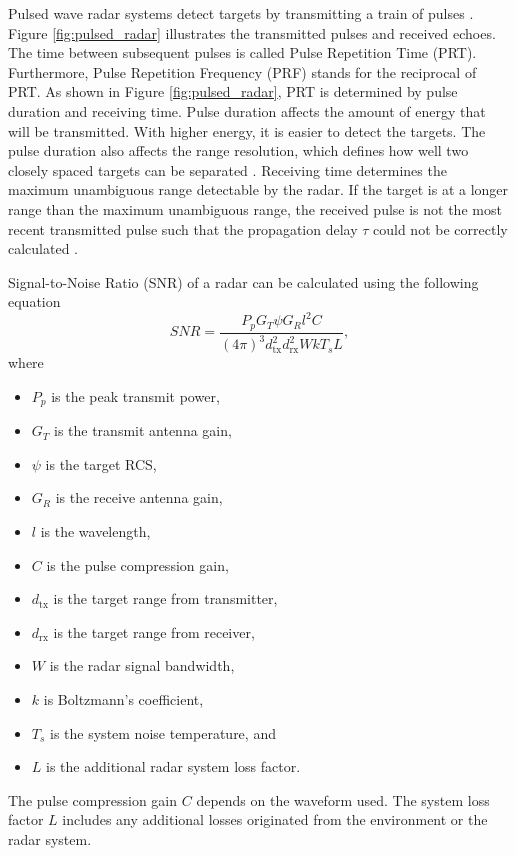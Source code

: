 \documentclass[english, 12pt, a4paper, elec, utf8, a-1b, online]{aaltothesis}
\numberwithin{equation}{section}
\begin{document}
Pulsed wave radar systems detect targets by transmitting a train of pulses \cite{Mahafza2015}.
Figure \ref{fig:pulsed_radar} illustrates the transmitted pulses and received echoes.
The time between subsequent pulses is called Pulse Repetition Time (PRT). 
Furthermore, Pulse Repetition Frequency (PRF) stands for the reciprocal of PRT.
As shown in Figure \ref{fig:pulsed_radar}, PRT is determined by pulse duration and receiving time.
Pulse duration affects the amount of energy that will be transmitted.
With higher energy, it is easier to detect the targets.
The pulse duration also affects the range resolution, which defines how well two closely spaced targets can be separated \cite{Curry2011}.
Receiving time determines the maximum unambiguous range detectable by the radar.
If the target is at a longer range than the maximum unambiguous range, the received pulse is not the most recent transmitted pulse such that the propagation delay $\tau$ could not be correctly calculated \cite{Curry2011}.

Signal-to-Noise Ratio (SNR) of a radar can be calculated using the following equation \cite{Curry2011}
\begin{equation} \label{eq:radar_snr}
SNR = \frac{P_p G_T \psi G_R l^2 C}{(4\pi)^3 d_\text{tx}^2 d_\text{rx}^2 W k T_s L},
\end{equation}
where
\begin{itemize}
    \item $P_p$ is the peak transmit power,
    \item $G_T$ is the transmit antenna gain,
    \item $\psi$ is the target RCS,
    \item $G_R$ is the receive antenna gain,
    \item $l$ is the wavelength,
    \item $C$ is the pulse compression gain,
    \item $d_\text{tx}$ is the target range from transmitter,
    \item $d_\text{rx}$ is the target range from receiver,
    \item $W$ is the radar signal bandwidth,
    \item $k$ is Boltzmann's coefficient,
    \item $T_s$ is the system noise temperature, and 
    \item $L$ is the additional radar system loss factor.
\end{itemize}
The pulse compression gain $C$ depends on the waveform used.
The system loss factor $L$ includes any additional losses originated from the environment or the radar system.
\end{document}
